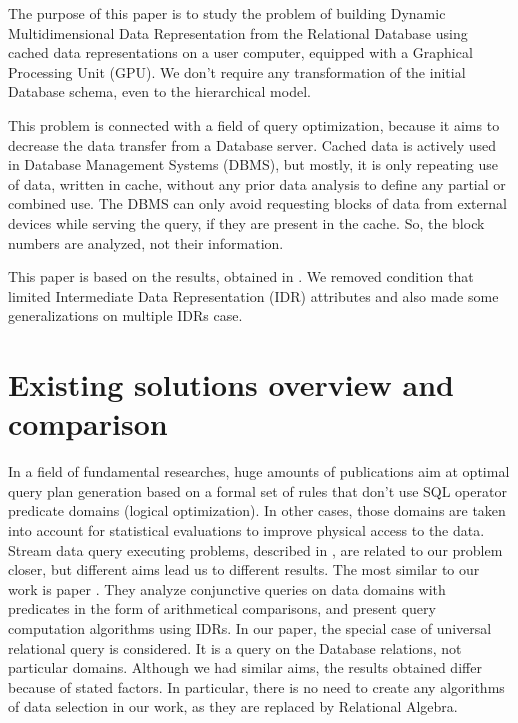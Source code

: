 \documentclass[10pt,journal,cspaper,compsoc]{IEEEtran}
\begin{document}
The purpose of this paper is to study the problem of building Dynamic
Multidimensional Data Representation from the Relational Database using
cached data representations on a user computer, equipped with a Graphical
Processing Unit (GPU). We don't require any transformation of the initial
Database schema, even to the hierarchical model.

This problem is connected with a field of query optimization, because it aims to
decrease the data transfer from a Database server. Cached data is actively
used in Database Management Systems (DBMS), but mostly, it is only repeating use
of data, written in cache, without any prior data analysis to define any partial
or combined use. The DBMS can only avoid requesting blocks of data from external
devices while serving the query, if they are present in the cache. So, the
block numbers are analyzed, not their information.

This paper is based on the results, obtained in \cite{zyk_pol}. We removed
condition that limited Intermediate Data Representation (IDR) attributes and
also made some generalizations on multiple IDRs case.

\section{Existing solutions overview and comparison}
In a field of fundamental researches, huge amounts of publications aim at optimal
query plan generation based on a formal set of rules that don't use SQL
operator predicate domains (logical optimization). In other cases, those domains
are taken into account for statistical evaluations to improve physical access to
the data. Stream data query executing problems, described in \cite{Olston03,
Denny05}, are related to our problem closer, but different aims lead us to
different results. The most similar to our work is paper \cite{Afrati06}. They
analyze conjunctive queries on data domains with predicates in the form of
arithmetical comparisons, and present query computation algorithms using IDRs. In
our paper, the special case of universal relational query is considered. It is a
query on the Database relations, not particular domains. Although we had similar
aims, the results obtained differ because of stated factors. In particular,
there is no need to create any algorithms of data selection in our work, as they
are replaced by Relational Algebra.
\end{document}
